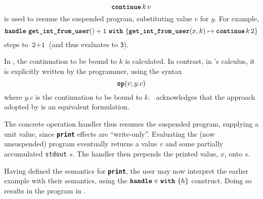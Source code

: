 \[\textbf{\texttt{continue}} \, {k} \, {v}\] 
is used to resume the suspended program, substituting value $v$ for $y$. For example,  
\[\textbf{\texttt{handle}} \,\, {\textbf{\texttt{get\_int\_from\_user}}() + \texttt{1}} \,\, \textbf{\texttt{with}} \,\, \{{\textbf{\texttt{get\_int\_from\_user}}(x, k) \mapsto \textbf{\texttt{continue}} \, {k} \, {\texttt{2}}}\}\]
steps to $\texttt{2} + \texttt{1}$ (and thus evaluates to \texttt{3}).

In \efflang{}, the continuation to be bound to $k$ is calculated. In contrast, in \citeauthor{pretnar-15}'s calculus, it is explicitly written by the programmer, using the syntax 
\[\textbf{\texttt{op}}({v; y.c})\]
where $y.c$ is the continuation to be bound to $k$.\ \citeauthor{pretnar-15} acknowledges that the approach adopted by \efflang{} is an equivalent formulation.

The concrete operation handler thus resumes the suspended program, supplying a unit value, since \textbf{\texttt{print}} effects are ``write-only''. Evaluating the (now unsuspended) program eventually returns a value $v$ and some partially accumulated \texttt{stdout} $s$. The handler then prepends the printed value, $x$, onto $s$. 



% 
Having defined the semantics for \textbf{\texttt{print}}, the user may now interpret the earlier example with their semantics, using the $\textbf{\texttt{handle}} \,\, {e} \,\, \textbf{\texttt{with}} \,\, \{{h}\}$ construct. Doing so results in the program in .

